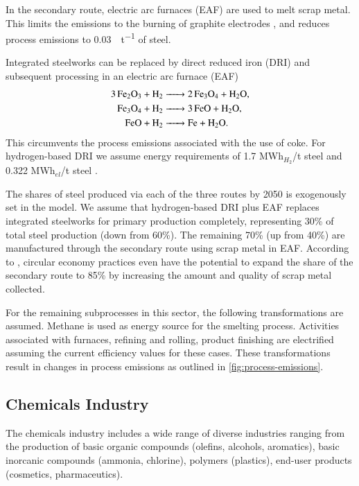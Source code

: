 In the secondary route, electric arc furnaces (EAF) are used to melt scrap
metal. This limits the \co emissions to the burning of graphite electrodes
, and reduces process emissions to
\SI{0.03}{\tco\per\tonne} of steel.

Integrated steelworks can be replaced by direct reduced iron (DRI) and subsequent processing in an electric arc furnace (EAF)
\begin{align}
    \ce{3Fe2O3 + H2 &-> 2Fe3O4 + H2O}, \\
    \ce{Fe3O4 + H2 &-> 3FeO + H2O}, \\
    \ce{FeO + H2 &-> Fe + H2O}.
\end{align}
This circumvents the process emissions associated with the use of coke. For
hydrogen-based DRI we assume energy requirements of 1.7 MWh$_{H_2}$/t steel
 and 0.322 MWh$_{el}$/t steel
\citeS{}.

The shares of steel produced via each of the three routes by 2050 is exogenously
set in the model. We assume that hydrogen-based DRI plus EAF replaces integrated
steelworks for primary production completely, representing 30\% of total steel
production (down from 60\%). The remaining 70\% (up from 40\%) are manufactured
through the secondary route using scrap metal in EAF. According to
, circular economy practices even have the potential to
expand the share of the secondary route to 85\% by increasing the amount and
quality of scrap metal collected.

For the remaining subprocesses in this sector, the following transformations are
assumed. Methane is used as energy source for the smelting process. Activities
associated with furnaces, refining and rolling, product finishing are
electrified assuming the current efficiency values for these cases.
These transformations result in changes in process emissions as outlined in \cref{fig:process-emissions}.


\subsection{Chemicals Industry}
\label{sec:si:industry:chemicals}

The chemicals industry includes a wide range of diverse industries ranging from
the production of basic organic compounds (olefins, alcohols, aromatics), basic
inorcanic compounds (ammonia, chlorine), polymers (plastics), end-user products
(cosmetics, pharmaceutics).

